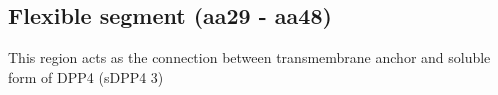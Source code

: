 \subsection{Flexible segment (aa29 - aa48)}

This region acts as the connection between transmembrane anchor and soluble form of DPP4 (sDPP4 3) 

